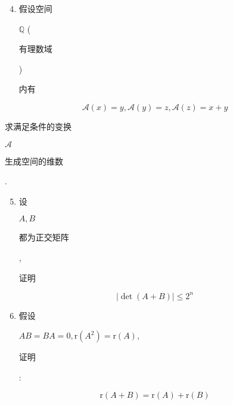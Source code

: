 \documentclass[10pt]{article}
\begin{document}
\begin{enumerate}
  \setcounter{enumi}{3}
  \item \begin{CJK}{UTF8}{mj}假设空间\end{CJK} $\mathbb{Q}$ (\begin{CJK}{UTF8}{mj}有理数域\end{CJK}) \begin{CJK}{UTF8}{mj}内有\end{CJK}
\end{enumerate}
$$
\mathscr{A}(x)=y, \mathscr{A}(y)=z, \mathscr{A}(z)=x+y
$$
\begin{CJK}{UTF8}{mj}求满足条件的变换\end{CJK} $\mathscr{A}$ \begin{CJK}{UTF8}{mj}生成空间的维数\end{CJK}.

\begin{enumerate}
  \setcounter{enumi}{4}
  \item \begin{CJK}{UTF8}{mj}设\end{CJK} $A, B$ \begin{CJK}{UTF8}{mj}都为正交矩阵\end{CJK}, \begin{CJK}{UTF8}{mj}证明\end{CJK}
\end{enumerate}
$$
|\operatorname{det}(A+B)| \leq 2^{n}
$$

\begin{enumerate}
  \setcounter{enumi}{5}
  \item \begin{CJK}{UTF8}{mj}假设\end{CJK} $A B=B A=0, \mathrm{r}\left(A^{2}\right)=\mathrm{r}(A)$, \begin{CJK}{UTF8}{mj}证明\end{CJK}:
\end{enumerate}
$$
\mathrm{r}(A+B)=\mathrm{r}(A)+\mathrm{r}(B)
$$
\end{document}
